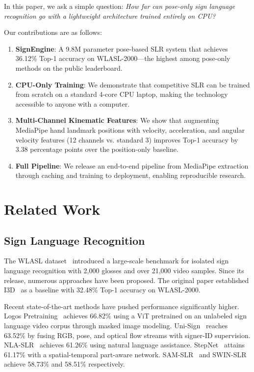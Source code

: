 \documentclass[conference]{IEEEtran}
\begin{document}
In this paper, we ask a simple question: \emph{How far can pose-only sign language recognition go with a lightweight architecture trained entirely on CPU?}

Our contributions are as follows:
\begin{enumerate}
    \item \textbf{SignEngine}: A 9.8M parameter pose-based SLR system that achieves 36.12\% Top-1 accuracy on WLASL-2000---the highest among pose-only methods on the public leaderboard.
    \item \textbf{CPU-Only Training}: We demonstrate that competitive SLR can be trained from scratch on a standard 4-core CPU laptop, making the technology accessible to anyone with a computer.
    \item \textbf{Multi-Channel Kinematic Features}: We show that augmenting MediaPipe hand landmark positions with velocity, acceleration, and angular velocity features (12 channels vs. standard 3) improves Top-1 accuracy by 3.38 percentage points over the position-only baseline.
    \item \textbf{Full Pipeline}: We release an end-to-end pipeline from MediaPipe extraction through caching and training to deployment, enabling reproducible research.
\end{enumerate}

\section{Related Work}

\subsection{Sign Language Recognition}

The WLASL dataset~\cite{wlasl2020} introduced a large-scale benchmark for isolated sign language recognition with 2,000 glosses and over 21,000 video samples. Since its release, numerous approaches have been proposed. The original paper established I3D~\cite{i3d} as a baseline with 32.48\% Top-1 accuracy on WLASL-2000.

Recent state-of-the-art methods have pushed performance significantly higher. Logos Pretraining~\cite{logos2025} achieves 66.82\% using a ViT pretrained on an unlabeled sign language video corpus through masked image modeling. Uni-Sign~\cite{unisign2025} reaches 63.52\% by fusing RGB, pose, and optical flow streams with signer-ID supervision. NLA-SLR~\cite{nlaslr2023} achieves 61.26\% using natural language assistance. StepNet~\cite{stepnet2022} attains 61.17\% with a spatial-temporal part-aware network. SAM-SLR~\cite{samslr2021} and SWIN-SLR~\cite{swinslr2023} achieve 58.73\% and 58.51\% respectively.
\end{document}

